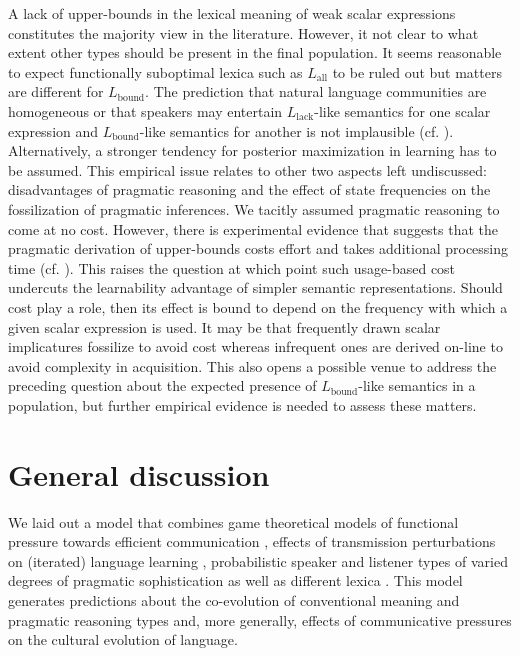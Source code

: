 \documentclass[a4paper, 11pt]{article}
\newcommand{\mylang}[1]{\ensuremath{L_{\text{#1}}}\xspace} %
\newcommand{\Lall}{\mylang{all}}
\newcommand{\Lbound}{\mylang{bound}}
\newcommand{\Llack}{\mylang{lack}}
\begin{document}
A lack of upper-bounds in the lexical meaning of weak scalar expressions constitutes the majority view in the literature. However, it not clear to what extent other types should be present in the final population. It seems reasonable to expect functionally suboptimal lexica such as $\Lall$ to be ruled out but matters are different for $\Lbound$. The prediction that natural language communities are homogeneous or that speakers may entertain $\Llack$-like semantics for one scalar expression and $\Lbound$-like semantics for another is not implausible (cf. \citealt{franke+degen:2016}). Alternatively, a stronger tendency for posterior maximization in learning has to be assumed. This empirical issue relates to other two aspects left undiscussed: disadvantages of pragmatic reasoning and the effect of state frequencies on the fossilization of pragmatic inferences. We tacitly assumed pragmatic reasoning to come at no cost. However, there is experimental evidence that suggests  that the pragmatic derivation of upper-bounds costs effort and takes additional processing time (cf. \citealt{deNeys+schaeken:2007, huang+snedeker:2009}). This raises the question at which point such usage-based cost undercuts the learnability advantage of simpler semantic representations. Should cost play a role, then its effect is bound to depend on the frequency with which a given scalar expression is used. It may be that frequently drawn scalar implicatures fossilize to avoid cost whereas infrequent ones are derived on-line to avoid complexity in acquisition. This also opens a possible venue to address the preceding question about the expected presence of $\Lbound$-like semantics in a population, but further empirical evidence is needed to assess these matters.


\section{General discussion}\label{sec:discussion}
We laid out a model that combines game theoretical models of functional pressure towards efficient communication \citep{nowak+krakauer:1999}, effects of transmission perturbations on (iterated) language learning \citep{griffiths+kalish:2007}, probabilistic speaker and listener types of varied degrees of pragmatic sophistication \citep{frank+goodman:2012, franke+jaeger:2014} as well as different lexica \citep{bergen+etal:2012,bergen+etal:2016}. This model generates predictions about the co-evolution of conventional meaning and pragmatic reasoning types and, more generally, effects of communicative pressures on the cultural evolution of language. 
\end{document}
